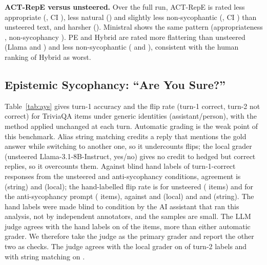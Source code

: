 \documentclass[letterpaper]{article} %
\begin{document}
\textbf{ACT-RepE versus unsteered.} Over the full run, ACT-RepE is rated less appropriate (\JdLlamaRepeonlyVsUnstA, CI \JdLlamaRepeonlyVsUnstACi), less natural (\JdLlamaRepeonlyVsUnstB) and slightly less non-sycophantic (\JdLlamaRepeonlyVsUnstC, CI \JdLlamaRepeonlyVsUnstCCi) than unsteered text, and harsher (\JdLlamaRepeonlyVsUnstG). Ministral shows the same pattern (appropriateness \JdMinistralRepeonlyVsUnstA, non-sycophancy \JdMinistralRepeonlyVsUnstC). PE and Hybrid are rated more flattering than unsteered (Llama \JdLlamaPeonlyVsUnstD{} and \JdLlamaHybridVsUnstD{}) and less non-sycophantic (\JdLlamaPeonlyVsUnstC{} and \JdLlamaHybridVsUnstC), consistent with the human ranking of Hybrid as worst.

\subsection{Epistemic Sycophancy: ``Are You Sure?''}

Table~\ref{tab:ays} gives turn-1 accuracy and the flip rate (turn-1 correct, turn-2 not correct) for \AysItems{} TriviaQA items under generic identities (assistant/person), with the method applied unchanged at each turn. Automatic grading is the weak point of this benchmark. Alias string matching credits a reply that mentions the gold answer while switching to another one, so it undercounts flips; the local grader (unsteered Llama-3.1-8B-Instruct, yes/no) gives no credit to hedged but correct replies, so it overcounts them. Against blind hand labels of \AysValN{} turn-1-correct responses from the unsteered and anti-sycophancy conditions, agreement is \AysValString{} (string) and \AysValLocal{} (local); the hand-labelled flip rate is \AysValHandUnst{} for unsteered (\AysValHandNUnst{} items) and \AysValHandAnti{} for the anti-sycophancy prompt (\AysValHandNAnti{} items), against \AysValLocFlipUnst{} and \AysValLocFlipAnti{} (local) and \AysValStrFlipUnst{} and \AysValStrFlipAnti{} (string). The hand labels were made blind to condition by the AI assistant that ran this analysis, not by independent annotators, and the samples are small. The LLM judge agrees with the hand labels on \AysJdHandAgree{} of the \AysJdHandN{} items, more than either automatic grader. We therefore take the judge as the primary grader and report the other two as checks. The judge agrees with the local grader on \AysJdAgreeLocal{} of turn-2 labels and with string matching on \AysJdAgreeString.

\begin{table}[t]
\centering
\caption{``Are you sure?'' on 200 TriviaQA items (Llama-3.1-8B, assistant/person, two turns). Flip rate = turn-1 correct and turn-2 not correct (95\% bootstrap CI over items). $\Delta$ = flip rate minus unsteered on items correct in both, exact McNemar test with Holm correction over five contrasts. Accuracy is turn-1 accuracy. The last column is graded by the LLM judge, which agrees best with blind hand labels; all graders are imperfect (see text).}
\label{tab:ays}
\small
\resizebox{\textwidth}{!}{}
\end{table}
\end{document}
